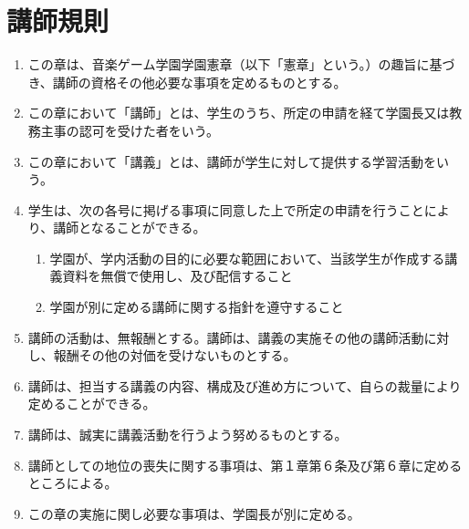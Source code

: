 \newpage
\chapter{講師規則}
\begin{enumerate}[label=第\arabic*条　]
  \item この章は、音楽ゲーム学園学園憲章（以下「憲章」という。）の趣旨に基づき、講師の資格その他必要な事項を定めるものとする。
  \item この章において「講師」とは、学生のうち、所定の申請を経て学園長又は教務主事の認可を受けた者をいう。
  \item この章において「講義」とは、講師が学生に対して提供する学習活動をいう。
  \item 学生は、次の各号に掲げる事項に同意した上で所定の申請を行うことにより、講師となることができる。
      \begin{enumerate}[label=(\arabic*)　]
        \item 学園が、学内活動の目的に必要な範囲において、当該学生が作成する講義資料を無償で使用し、及び配信すること
        \item 学園が別に定める講師に関する指針を遵守すること
      \end{enumerate}
  \item 講師の活動は、無報酬とする。講師は、講義の実施その他の講師活動に対し、報酬その他の対価を受けないものとする。
  \item 講師は、担当する講義の内容、構成及び進め方について、自らの裁量により定めることができる。
  \item 講師は、誠実に講義活動を行うよう努めるものとする。
  \item 講師としての地位の喪失に関する事項は、第１章第６条及び第６章に定めるところによる。
  \item この章の実施に関し必要な事項は、学園長が別に定める。
\end{enumerate}